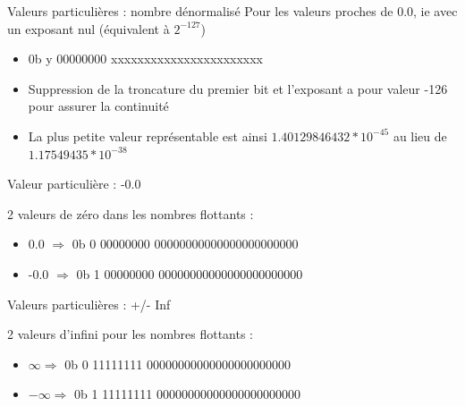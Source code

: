 \documentclass{beamer}
\begin{document}
  \begin{frame}{Valeurs particulières : nombre dénormalisé}
  Pour les valeurs proches de 0.0, ie avec un exposant nul (équivalent à $2^{-127}$)
  \begin{itemize}
  \item 0b \textcolor{SignColor}{y} \textcolor{ExponentColor}{00000000} \textcolor{FractionColor}{xxxxxxxxxxxxxxxxxxxxxxx}
  \item Suppression de la troncature du premier bit et l'exposant a pour valeur -126 pour assurer la continuité 
  \item La plus petite valeur représentable est ainsi $1.40129846432*10^{-45}$ au lieu de $1.17549435*10^{-38}$
  \end{itemize}

  \end{frame}

  \begin{frame}{Valeur particulière : -0.0}
    \begin{large}
  2 valeurs de zéro dans les nombres flottants :
  \begin{itemize}
  \item 0.0 $\Rightarrow$ 0b \textcolor{SignColor}{0} \textcolor{ExponentColor}{00000000} \textcolor{FractionColor}{00000000000000000000000} \\
  \item -0.0 $\Rightarrow$ 0b \textcolor{SignColor}{1} \textcolor{ExponentColor}{00000000} \textcolor{FractionColor}{00000000000000000000000}
  \end{itemize}
        \end{large}
  \end{frame}

  \begin{frame}{Valeurs particulières : +/- Inf}
      \begin{large}
  2 valeurs d'infini pour les nombres flottants :
  \begin{itemize}
  \item $\infty \Rightarrow$ 0b \textcolor{SignColor}{0} \textcolor{ExponentColor}{11111111} \textcolor{FractionColor}{00000000000000000000000} \\
    \item $-\infty \Rightarrow$ 0b \textcolor{SignColor}{1} \textcolor{ExponentColor}{11111111} \textcolor{FractionColor}{00000000000000000000000} \\
  \end{itemize}
        \end{large}
  \end{frame}
  
\end{document}
